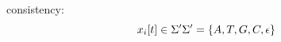 \documentclass[preview]{standalone}
\begin{document}
\begin{center}
consistency:\\
            \begin{equation}
            x_i[t] \in \Sigma '\\
            \Sigma ' = \{A,T,G,C,\epsilon \}
            \end{equation}
\end{center}
\end{document}
